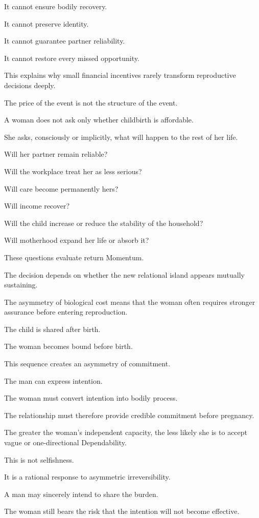 It cannot ensure bodily recovery.

It cannot preserve identity.

It cannot guarantee partner reliability.

It cannot restore every missed opportunity.

This explains why small financial incentives rarely transform reproductive decisions deeply.

The price of the event is not the structure of the event.

A woman does not ask only whether childbirth is affordable.

She asks, consciously or implicitly, what will happen to the rest of her life.

Will her partner remain reliable?

Will the workplace treat her as less serious?

Will care become permanently hers?

Will income recover?

Will the child increase or reduce the stability of the household?

Will motherhood expand her life or absorb it?

These questions evaluate return Momentum.

The decision depends on whether the new relational island appears mutually sustaining.

The asymmetry of biological cost means that the woman often requires stronger assurance before entering reproduction.

The child is shared after birth.

The woman becomes bound before birth.

This sequence creates an asymmetry of commitment.

The man can express intention.

The woman must convert intention into bodily process.

The relationship must therefore provide credible commitment before pregnancy.

The greater the woman’s independent capacity, the less likely she is to accept vague or one-directional Dependability.

This is not selfishness.

It is a rational response to asymmetric irreversibility.

A man may sincerely intend to share the burden.

The woman still bears the risk that the intention will not become effective.

